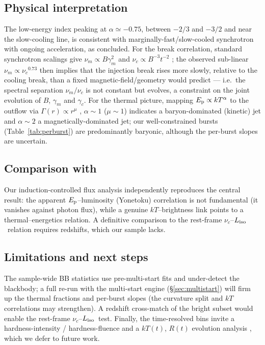 \documentclass[twocolumn]{aastex631}
\newcommand{\nuc}{\ensuremath{\nu_c}}
\newcommand{\num}{\ensuremath{\nu_m}}
\newcommand{\Ep}{\ensuremath{E_{\rm p}}}
\newcommand{\kT}{\ensuremath{kT}}
\newcommand{\Liso}{\ensuremath{L_{\rm iso}}}
\begin{document}
\subsection{Physical interpretation}
The low-energy index peaking at $\alpha\simeq-0.75$, between $-2/3$ and $-3/2$ and
near the slow-cooling line, is consistent with marginally-fast/slow-cooled
synchrotron with ongoing acceleration, as \citet{Burgess2014b} concluded. For the
break correlation, standard synchrotron scalings give $\num\propto B\gamma_m^2$ and
$\nuc\propto B^{-3}t^{-2}$ \citep{Sari1998}; the observed sub-linear
$\num\propto\nuc^{0.73}$ then implies that the injection break rises more slowly,
relative to the cooling break, than a fixed magnetic-field/geometry would predict
--- i.e.\ the spectral separation $\num/\nuc$ is not constant but evolves, a
constraint on the joint evolution of $B$, $\gamma_m$ and $\gamma_c$. For the
thermal picture, mapping $\Ep\propto\kT^{\alpha}$ to the outflow via
$\Gamma(r)\propto r^{\mu}$ \citep{Burgess2014a}, $\alpha\!\sim\!1$ ($\mu\!\sim\!1$)
indicates a baryon-dominated (kinetic) jet and $\alpha\!\sim\!2$ a
magnetically-dominated jet; our well-constrained bursts (Table~\ref{tab:perburst})
are predominantly baryonic, although the per-burst slopes are uncertain.

\subsection{Comparison with \citet{Mei2024}}
Our induction-controlled flux analysis independently reproduces the central
\citeauthor{Mei2024} result: the apparent $\Ep$--luminosity (Yonetoku) correlation
is not fundamental (it vanishes against photon flux), while a genuine
$\kT$--brightness link points to a thermal--energetics relation. A definitive
comparison to the rest-frame $\nuc$--\Liso\ relation requires redshifts, which
our sample lacks.

\subsection{Limitations and next steps}
The sample-wide BB statistics use pre-multi-start fits and under-detect the
blackbody; a full re-run with the multi-start engine (\S\ref{sec:multistart}) will
firm up the thermal fractions and per-burst slopes (the curvature split and
$\kT$ correlations may strengthen). A redshift cross-match of the bright subset
would enable the rest-frame $\nuc$--\Liso\ test. Finally, the time-resolved bins
invite a hardness-intensity / hardness-fluence and a $\kT(t)$, $R(t)$ evolution
analysis \citep{Burgess2014b}, which we defer to future work.
\end{document}
